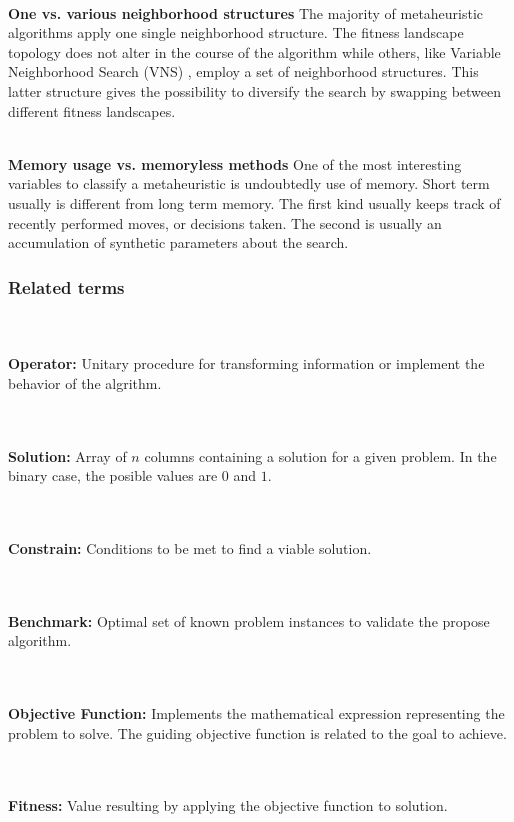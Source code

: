 ~\\
\textbf{One vs. various neighborhood structures}
The majority of metaheuristic algorithms apply one single neighborhood structure. The fitness landscape topology does not alter in the course of the algorithm while others, like Variable Neighborhood Search (VNS) \cite{DBLP:journals/anor/SarasolaDSA16}, employ a set of neighborhood structures. This latter structure gives the possibility to diversify the search by swapping between different fitness landscapes.

~\\
\textbf{Memory usage vs. memoryless methods}
One of the most interesting variables to classify a metaheuristic is undoubtedly use of memory. Short term usually is different from long term memory. The first kind usually keeps track of recently performed moves, or decisions taken. The second is usually an accumulation of synthetic parameters about the search. 

\subsubsection{Related terms}
~\\~\\
\textbf{Operator:} 
Unitary procedure for transforming information or implement the behavior of the algrithm.

~\\~\\
\textbf{Solution:} 
Array of $n$ columns containing a solution for a given problem. In the binary case, the posible values are $0$ and $1$.

~\\~\\
\textbf{Constrain:} 
Conditions to be met to find a viable solution.

~\\~\\
\textbf{Benchmark:} 
Optimal set of known problem instances to validate the propose algorithm.

~\\~\\
\textbf{Objective Function:}  
Implements the mathematical expression representing the problem to solve. The guiding objective function is related to the goal to achieve.

~\\~\\
\textbf{Fitness:} 
Value resulting by applying the objective function to solution.

